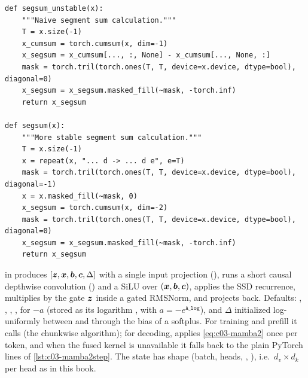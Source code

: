 \begin{lstlisting}[caption={Excerpt from \texttt{repos/\allowbreak state-spaces\_\_mamba/\allowbreak mamba\_ssm/\allowbreak modules/\allowbreak ssd\_minimal.py}: naive and stable segment sums.},label={lst:c03-ssd}]
def segsum_unstable(x):
    """Naive segment sum calculation."""
    T = x.size(-1)
    x_cumsum = torch.cumsum(x, dim=-1)
    x_segsum = x_cumsum[..., :, None] - x_cumsum[..., None, :]
    mask = torch.tril(torch.ones(T, T, device=x.device, dtype=bool), diagonal=0)
    x_segsum = x_segsum.masked_fill(~mask, -torch.inf)
    return x_segsum

def segsum(x):
    """More stable segment sum calculation."""
    T = x.size(-1)
    x = repeat(x, "... d -> ... d e", e=T)
    mask = torch.tril(torch.ones(T, T, device=x.device, dtype=bool), diagonal=-1)
    x = x.masked_fill(~mask, 0)
    x_segsum = torch.cumsum(x, dim=-2)
    mask = torch.tril(torch.ones(T, T, device=x.device, dtype=bool), diagonal=0)
    x_segsum = x_segsum.masked_fill(~mask, -torch.inf)
    return x_segsum
\end{lstlisting}

\begin{implnote}[title={In the code: the Mamba-2 block and its decoding step}]
 in  produces
$[\bm{z},\bm{x},\bm{b},\bm{c},\Delta]$ with a single input projection (), runs a short causal
depthwise convolution () and a SiLU over $(\bm{x},\bm{b},\bm{c})$, applies the SSD
recurrence, multiplies by the gate $\bm{z}$ inside a gated RMSNorm, and projects back. Defaults:
, , , ,
 for $-a$ (stored as its logarithm , with $a=-e^{\texttt{A\_log}}$), and $\Delta$ initialized log-uniformly
between  and  through the bias of a softplus. For training
and prefill it calls  (the chunkwise algorithm); for decoding,
 applies \cref{eq:c03-mamba2} once per token, and when the fused
 kernel is unavailable it falls back to the plain PyTorch lines of
\cref{lst:c03-mamba2step}. The state  has shape (batch, heads, ,
), i.e.\ $d_v\times d_k$ per head as in this book.
\end{implnote}

